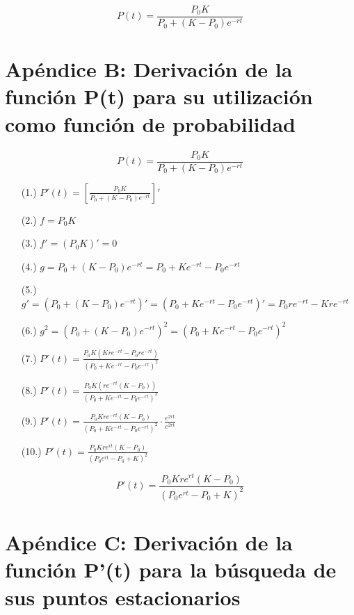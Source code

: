 \begin{appendixes}
    \begin{equation*}
    \boxed{P(t) = \displaystyle\frac{P_0 K}{P_0 + (K-P_0)e^{-rt}}}
    \end{equation*}
    
    \section{Ap\'endice B: Derivaci\'on de la funci\'on P(t) para su utilizaci\'on como funci\'on de probabilidad}
    \label{app-b}
    
    \begin{equation*}
    \boxed{P(t) = \displaystyle\frac{P_0 K}{P_0 + (K-P_0)e^{-rt}}}
    \end{equation*}
    
    \begin{enumerate}
    \item [(1.)] $P'(t) = \left[\displaystyle\frac{P_0 K}{P_0 + (K-P_0)e^{-rt}}\right]'$
    \item [(2.)] $f = P_0 K $
    \item [(3.)] $f' = (P_0 K)' = 0$
    \item [(4.)] $g = P_0 + (K-P_0)e^{-rt} = P_0 + K e^{-rt} - P_0 e^{-rt}$
    \item [(5.)] $g' = (P_0 + (K-P_0)e^{-rt})' = (P_0 + K e^{-rt} - P_0 e^{-rt})' = P_0 r e^{-rt} - K r e^{-rt}$
    \item [(6.)] $g^2 = (P_0 + (K-P_0)e^{-rt})^2 = (P_0 + K e^{-rt} - P_0 e^{-rt})^2$
    \item [(7.)] $P'(t) = \displaystyle\frac{P_0 K(K r e^{-rt} - P_0 r e^{-rt})}{(P_0 + K e^{-rt} - P_0 e^{-rt})^2}$
    \item [(8.)] $P'(t) = \displaystyle\frac{P_0 K(r e^{-rt}(K - P_0))}{(P_0 + K e^{-rt} - P_0 e^{-rt})^2}$
    \item [(9.)] $P'(t) = \displaystyle\frac{P_0 K r e^{-rt}(K - P_0)}{(P_0 + K e^{-rt} - P_0 e^{-rt})^2} \cdot \displaystyle\frac{e^{2rt}}{e^{2rt}}$
    \item [(10.)] $P'(t) = \displaystyle\frac{P_0 K r e^{rt}(K - P_0)}{(P_0 e^{rt} - P_0 + K)^2}$
    \end{enumerate}
    
    \begin{equation*}
    \boxed{P'(t) = \displaystyle\frac{P_0 K r e^{rt}(K-P_0)}{(P_0 e^{rt} - P_0 + K)^2}}
    \end{equation*}
    
    \section{Ap\'endice C: Derivaci\'on de la funci\'on P'(t) para la b\'usqueda de sus puntos estacionarios}
    \label{app-c}
    

\end{appendixes}
